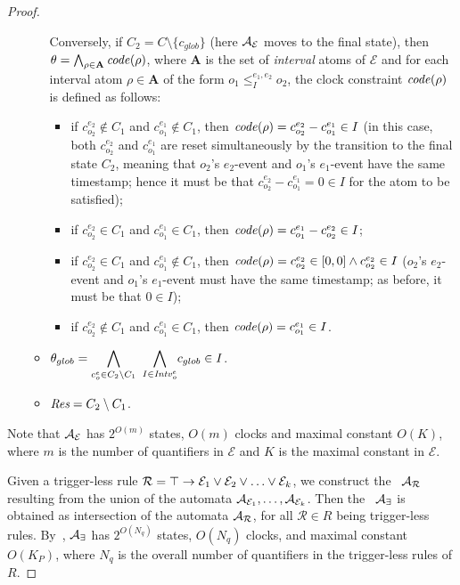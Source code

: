 \begin{proof}
\begin{itemize}
\begin{itemize}
     Conversely, if $C_2= C\setminus \{c_{glob}\}$ (here $\mathcal{A}_{\mathcal{E}}$ moves to the final state), then $\theta = \bigwedge_{\rho\in \mathbf{A}}{\mathit{code}}(\rho)$,
     where  $\mathbf{A}$  is the set of \emph{interval} atoms of $\mathcal{E}$ and for each interval atom $\rho\in \mathbf{A}$ of the form $o_1\leq^{e_1,e_2}_{I} o_2$, the clock constraint ${\mathit{code}}(\rho)$ is defined as follows:
     \begin{itemize}
       \item if $c_{o_2}^{e_2}\notin C_1$ and $c_{o_1}^{e_1}\notin C_1$, then ${\mathit{code}}(\rho)= c_{o_2}^{e_2}-c_{o_1}^{e_1} \in I$ (in this case, both $c_{o_2}^{e_2}$ and $c_{o_1}^{e_1}$ are reset simultaneously by the transition to the final state $C_2$, meaning that $o_2$'s $e_2$-event and $o_1$'s $e_1$-event have the same timestamp; hence it must be that $c_{o_2}^{e_2}-c_{o_1}^{e_1} = 0 \in I$ for the atom to be satisfied);
       \item  if $c_{o_2}^{e_2}\in C_1$ and $c_{o_1}^{e_1}\in C_1$, then ${\mathit{code}}(\rho)= c_{o_1}^{e_1}-c_{o_2}^{e_2} \in I$;
       \item  if $c_{o_2}^{e_2}\in C_1$ and $c_{o_1}^{e_1}\notin C_1$, then ${\mathit{code}}(\rho)= c_{o_2}^{e_2}\in [0,0]\wedge c_{o_2}^{e_2}\in I$ ($o_2$'s $e_2$-event and $o_1$'s $e_1$-event must have the same timestamp; as before, it must be that $0\in I$);
       \item  if $c_{o_2}^{e_2}\notin C_1$ and $c_{o_1}^{e_1}\in C_1$, then ${\mathit{code}}(\rho)= c_{o_1}^{e_1}\in I$.
     \end{itemize}
     \item $\theta_{glob} = \displaystyle{\bigwedge_{c_o^{e}\in C_2\setminus C_1 } \,\,\bigwedge_{I\in {\mathit{Intv}}_o^{e} }} c_{glob}\in I$.
     \item $\textit{Res} = C_2 \setminus C_1$.
     \end{itemize}
\end{itemize}
  Note that $\mathcal{A}_{\mathcal{E}}$ has $2^{O(m)}$ states, $O(m)$ clocks and maximal constant $O(K)$, where
  $m$ is the number of quantifiers in  $\mathcal{E}$
  and $K$ is the maximal constant in $\mathcal{E}$.

 Given a trigger-less rule $\mathcal{R}=\operatorname{\top} \to \mathcal{E}_1\lor \mathcal{E}_2\lor \ldots \lor \mathcal{E}_k$, we construct the \TA\  $\mathcal{A}_{\mathcal{R}}$ resulting from the union of the automata
 $\mathcal{A}_{\mathcal{E}_1},\ldots,\mathcal{A}_{\mathcal{E}_k}$. Then the \TA\ $\mathcal{A}_\exists$ is obtained as intersection of the automata $\mathcal{A}_{\mathcal{R}}$, for all $\mathcal{R}\in R$ being trigger-less rules.
 By~\cite{ALUR1994183},  $\mathcal{A}_\exists$ has  $2^{O(N_q)}$ states, $O(N_q)$ clocks, and maximal constant $O(K_P)$, where
  $ N_q$ is the overall number of quantifiers in the  trigger-less rules of  $R$. 
%  
 \end{proof} 

